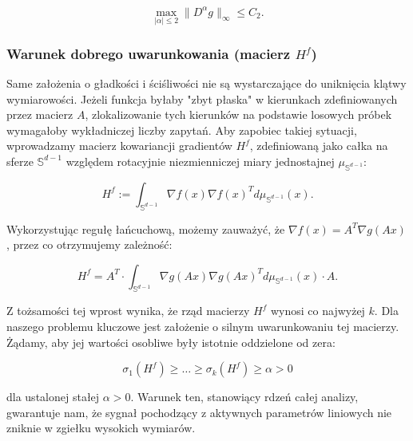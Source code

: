 $$\max_{|\alpha|\le 2} \|D^\alpha g\|_\infty \le C_2.$$


\subsubsection{Warunek dobrego uwarunkowania (macierz $H^f$)}
Same założenia o gładkości i ściśliwości nie są wystarczające do uniknięcia klątwy wymiarowości. Jeżeli funkcja byłaby "zbyt płaska" w kierunkach zdefiniowanych przez macierz $A$, zlokalizowanie tych kierunków na podstawie losowych próbek wymagałoby wykładniczej liczby zapytań. Aby zapobiec takiej sytuacji, wprowadzamy macierz kowariancji gradientów $H^f$, zdefiniowaną jako całka na sferze $\mathbb{S}^{d-1}$ względem rotacyjnie niezmienniczej miary jednostajnej $\mu_{\mathbb{S}^{d-1}}$:


$$H^f := \int_{\mathbb{S}^{d-1}} \nabla f(x)\nabla f(x)^T d\mu_{\mathbb{S}^{d-1}}(x).$$


Wykorzystując regułę łańcuchową, możemy zauważyć, że $\nabla f(x) = A^T \nabla g(Ax)$, przez co otrzymujemy zależność:


$$H^f = A^T \cdot \int_{\mathbb{S}^{d-1}} \nabla g(Ax)\nabla g(Ax)^T d\mu_{\mathbb{S}^{d-1}}(x) \cdot A.$$

Z tożsamości tej wprost wynika, że rząd macierzy $H^f$ wynosi co najwyżej $k$. Dla naszego problemu kluczowe jest założenie o silnym uwarunkowaniu tej macierzy. Żądamy, aby jej wartości osobliwe były istotnie oddzielone od zera:


$$\sigma_1(H^f) \ge \dots \ge \sigma_k(H^f) \ge \alpha > 0$$

dla ustalonej stałej $\alpha > 0$. Warunek ten, stanowiący rdzeń całej analizy, gwarantuje nam, że sygnał pochodzący z aktywnych parametrów liniowych nie zniknie w zgiełku wysokich wymiarów.
